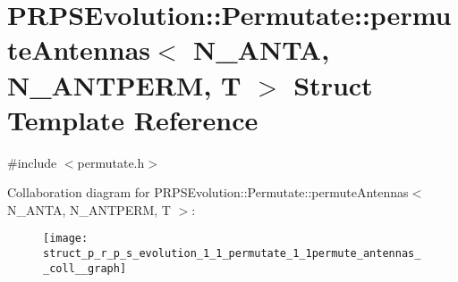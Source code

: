 \hypertarget{struct_p_r_p_s_evolution_1_1_permutate_1_1permute_antennas}{\section{\-P\-R\-P\-S\-Evolution\-:\-:\-Permutate\-:\-:permute\-Antennas$<$ \-N\-\_\-\-A\-N\-T\-A, \-N\-\_\-\-A\-N\-T\-P\-E\-R\-M, \-T $>$ \-Struct \-Template \-Reference}
\label{struct_p_r_p_s_evolution_1_1_permutate_1_1permute_antennas}
}


{\ttfamily \#include $<$permutate.\-h$>$}



\-Collaboration diagram for \-P\-R\-P\-S\-Evolution\-:\-:\-Permutate\-:\-:permute\-Antennas$<$ \-N\-\_\-\-A\-N\-T\-A, \-N\-\_\-\-A\-N\-T\-P\-E\-R\-M, \-T $>$\-:
\nopagebreak
\begin{figure}[H]
\begin{center}
\leavevmode
\texttt{[image: struct\_p\_r\_p\_s\_evolution\_1\_1\_permutate\_1\_1permute\_antennas\_\_coll\_\_graph]}
\end{center}
\end{figure}
